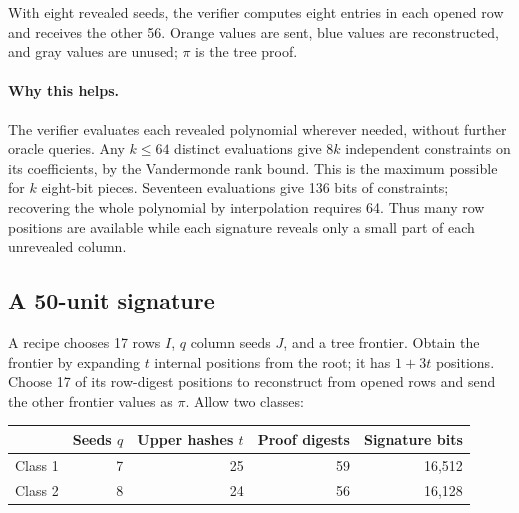 \documentclass[10pt]{article}
\begin{document}
\begin{center}

\small With eight revealed seeds, the verifier computes eight entries in each opened row and receives the other 56. Orange values are sent, blue values are reconstructed, and gray values are unused; $\pi$ is the tree proof.
\end{center}

\paragraph{Why this helps.} The verifier evaluates each revealed polynomial wherever needed, without further oracle queries. Any $k\le64$ distinct evaluations give $8k$ independent constraints on its coefficients, by the Vandermonde rank bound. This is the maximum possible for $k$ eight-bit pieces. Seventeen evaluations give 136 bits of constraints; recovering the whole polynomial by interpolation requires 64. Thus many row positions are available while each signature reveals only a small part of each unrevealed column.

\clearpage
\subsection{A 50-unit signature}
A recipe chooses 17 rows $I$, $q$ column seeds $J$, and a tree frontier. Obtain the frontier by expanding $t$ internal positions from the root; it has $1+3t$ positions. Choose 17 of its row-digest positions to reconstruct from opened rows and send the other frontier values as $\pi$. Allow two classes:
\begin{center}
\begin{tabular}{lrrrr}
 & Seeds $q$ & Upper hashes $t$ & Proof digests & Signature bits\\
\hline
Class 1 & 7 & 25 & 59 & 16,512\\
Class 2 & 8 & 24 & 56 & 16,128
\end{tabular}
\end{center}
\end{document}
